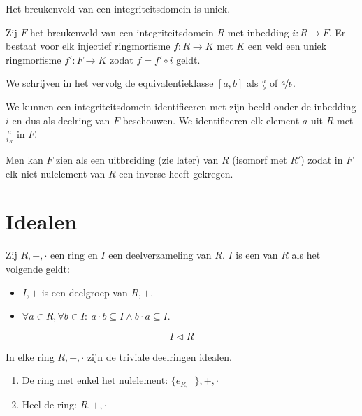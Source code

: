 \documentclass[main.tex]{subfiles}
\begin{document}
\begin{ei}
  Het breukenveld van een integriteitsdomein is uniek.
  \zb
\end{ei}

\begin{ei}
  Zij $F$ het breukenveld van een integriteitsdomein $R$ met inbedding $i: R \rightarrow F$.
  Er bestaat voor elk injectief ringmorfisme $f: R \rightarrow K$ met $K$ een veld een uniek ringmorfisme $f': F \rightarrow K$ zodat $f = f' \circ i$ geldt.
  \zb
\end{ei}

\begin{de}
  We schrijven in het vervolg de equivalentieklasse $[a,b]$ als $\frac{a}{b}$ of $\nicefrac{a}{b}$.
\end{de}

\begin{opm}
  We kunnen een integriteitsdomein identificeren met zijn beeld onder de inbedding $i$ en dus als deelring van $F$ beschouwen.
  We identificeren elk element $a$ uit $R$ met $\frac{a}{i_{R}}$ in $F$.
\end{opm}

\begin{opm}
  Men kan $F$ zien als een uitbreiding (zie later) van $R$ (isomorf met $R'$) zodat in $F$ elk niet-nulelement van $R$ een inverse heeft gekregen.
\end{opm}


\section{Idealen}
\label{sec:idealen}


\begin{de}
  Zij $R,+,\cdot$ een ring en $I$ een deelverzameling van $R$.
  $I$ is een  van $R$ als het volgende geldt:
  \begin{itemize}
  \item $I,+$ is een deelgroep van $R,+$.
  \item $\forall a \in R, \forall b \in I:\ a\cdot b \subseteq I \wedge b\cdot a \subseteq I$. 
  \end{itemize}
  \[ I \triangleleft R \]
\end{de}

\begin{st}
  In elke ring $R,+,\cdot$ zijn de triviale deelringen idealen.
  \begin{enumerate}
  \item De ring met enkel het nulelement: $\{e_{R,+}\},+,\cdot$
  \item Heel de ring: $R,+,\cdot$
  \end{enumerate}
\end{st}
\end{document}
